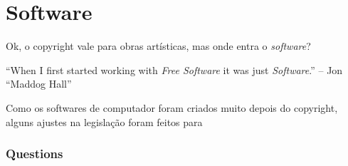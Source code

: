 \documentclass[serif,mathserif]{beamer}
\begin{document}
\section{Software} %

\begin{frame}
  Ok, o copyright vale para obras artísticas, mas onde entra o \emph{software}? \pause
    
  \vspace{5mm} %
  ``When I first started working with \emph{Free Software} it was just \emph{Software}.'' -- Jon ``Maddog Hall''
  
  Como os softwares de computador foram criados muito depois do copyright, alguns ajustes na legislação foram feitos
  para 
\end{frame}

\begin{frame}
  \frametitle{Questions}
\end{frame}
\end{document}
